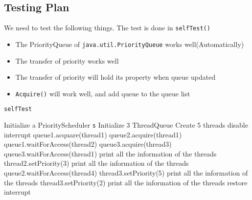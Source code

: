 \documentclass{article}
\begin{document}
\begin{spacing}{1.1}
\subsection{Testing Plan}
We need to test the following things. The test is done in \texttt{selfTest()}
\begin{itemize}
\item The PriorityQueue of \texttt{java.util.PriorityQueue} works well(Automatically)
\item The transfer of priority works well
\item The transfer of priority will hold its property when queue updated
\item \texttt{Acquire()} will work well, and add queue to the queue list
\end{itemize}

\begin{algorithm}
  \caption{\texttt{selfTest}}
\begin{algorithmic}[1]
  \STATE Initialize a PriorityScheduler \texttt{s}
  \STATE Initialize 3 ThreadQueue
  \STATE Create 5 threads
  \STATE disable interrupt
  \STATE
  \STATE queue1.acquare(thread1)
  \STATE queue2.acquire(thread1)
  \STATE queue1.waitForAccess(thread2)
  \STATE queue3.acquire(thread3)
  \STATE queue3.waitForAccess(thread1)
  \STATE print all the information of the threads
  \STATE
  \STATE thread2.setPriority(3)
  \STATE print all the information of the threads
  \STATE
  \STATE queue2.waitForAccess(thread4)
  \STATE thread3.setPriority(5)
  \STATE print all the information of the threads
  \STATE
  \STATE thread3.setPriority(2)
  \STATE print all the information of the threads
  \STATE
  \STATE restore interrupt
\end{algorithmic}
\end{algorithm}


\end{spacing}
\end{document}
